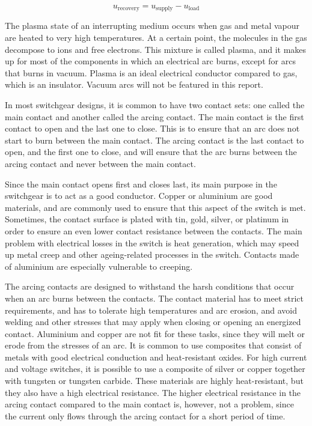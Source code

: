 \documentclass[10pt,a4paper,twoside]{article}
\begin{document}
\begin{equation} \label{eq:U_rec}
u_\mathrm{{recovery}}=u_\mathrm{{supply}}-u_\mathrm{{load}}
\end{equation}  

The plasma state of an interrupting medium occurs when gas and metal vapour are heated to very high temperatures. At a certain point, the molecules in the gas decompose to ions and free electrons. This mixture is called plasma, and it makes up for most of the components in which an electrical arc burns, except for arcs that burns in vacuum. Plasma is an ideal electrical conductor compared to gas, which is an insulator. Vacuum arcs will not be featured in this report.

In most switchgear designs, it is common to have two contact sets: one called the main contact and another called the arcing contact. The main contact is the first contact to open and the last one to close. This is to ensure that an arc does not start to burn between the main contact. The arcing contact is the last contact to open, and the first one to close, and will ensure that the arc burns between the arcing contact and never between the main contact.

Since the main contact opens first and closes last, its main purpose in the switchgear is to act as a good conductor. Copper or aluminium are good materials, and are commonly used to ensure that this aspect of the switch is met. Sometimes, the contact surface is plated with tin, gold, silver, or platinum in order to ensure an even lower contact resistance between the contacts. The main problem with electrical losses in the switch is heat generation, which may speed up metal creep and other ageing-related processes in the switch. Contacts made of aluminium are especially vulnerable to creeping.

The arcing contacts are designed to withstand the harsh conditions that occur when an arc burns between the contacts. The contact material has to meet strict requirements, and has to tolerate high temperatures and arc erosion, and avoid welding and other stresses that may apply when closing or opening an energized contact. Aluminium and copper are not fit for these tasks, since they will melt or erode from the stresses of an arc. It is common to use composites that consist of metals with good electrical conduction and heat-resistant oxides. For high current and voltage switches, it is possible to use a composite of silver or copper together with tungsten or tungsten carbide. These materials are highly heat-resistant, but they also have a high electrical resistance. The higher electrical resistance in the arcing contact compared to the main contact is, however, not a problem, since the current only flows through the arcing contact for a short period of time.
\end{document}
